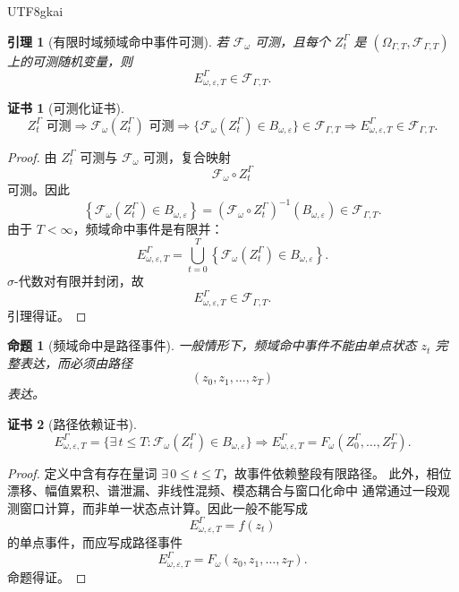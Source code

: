 \documentclass[12pt]{article}
\newtheorem{proposition}{命题}[section]
\newtheorem{lemma}{引理}[section]
\newtheorem{Certificate}{证书}[section]
\begin{document}
\begin{CJK*}{UTF8}{gkai}
\begin{lemma}[有限时域频域命中事件可测]
若 \(\mathcal F_\omega\) 可测，且每个 \(Z_t^\Gamma\) 是
\((\Omega_{\Gamma,T},\mathscr F_{\Gamma,T})\) 上的可测随机变量，则
\[
E_{\omega,\varepsilon,T}^{\Gamma}\in\mathscr F_{\Gamma,T}.
\]
\end{lemma}

\begin{Certificate}[可测化证书]
\[
\boxed{
Z_t^\Gamma\text{ 可测}
\Rightarrow
\mathcal F_\omega(Z_t^\Gamma)\text{ 可测}
\Rightarrow
\{\mathcal F_\omega(Z_t^\Gamma)\in B_{\omega,\varepsilon}\}\in\mathscr F_{\Gamma,T}
\Rightarrow
E_{\omega,\varepsilon,T}^{\Gamma}\in\mathscr F_{\Gamma,T}.
}
\]
\end{Certificate}

\begin{proof}
由 \(Z_t^\Gamma\) 可测与 \(\mathcal F_\omega\) 可测，复合映射
\[
\mathcal F_\omega\circ Z_t^\Gamma
\]
可测。因此
\[
\left\{
\mathcal F_\omega(Z_t^\Gamma)\in B_{\omega,\varepsilon}
\right\}
=
(\mathcal F_\omega\circ Z_t^\Gamma)^{-1}(B_{\omega,\varepsilon})
\in\mathscr F_{\Gamma,T}.
\]
由于 \(T<\infty\)，频域命中事件是有限并：
\[
E_{\omega,\varepsilon,T}^{\Gamma}
=
\bigcup_{t=0}^{T}
\left\{
\mathcal F_\omega(Z_t^\Gamma)\in B_{\omega,\varepsilon}
\right\}.
\]
\(\sigma\)-代数对有限并封闭，故
\[
E_{\omega,\varepsilon,T}^{\Gamma}\in\mathscr F_{\Gamma,T}.
\]
引理得证。
\end{proof}

\begin{proposition}[频域命中是路径事件]
一般情形下，频域命中事件不能由单点状态 \(z_t\) 完整表达，而必须由路径
\[
(z_0,z_1,\ldots,z_T)
\]
表达。
\end{proposition}

\begin{Certificate}[路径依赖证书]
\[
\boxed{
E_{\omega,\varepsilon,T}^{\Gamma}
=
\{\exists\,t\le T:\mathcal F_\omega(Z_t^\Gamma)\in B_{\omega,\varepsilon}\}
\Rightarrow
E_{\omega,\varepsilon,T}^{\Gamma}
=
F_\omega(Z_0^\Gamma,\ldots,Z_T^\Gamma).
}
\]
\end{Certificate}

\begin{proof}
定义中含有存在量词 \(\exists\,0\le t\le T\)，故事件依赖整段有限路径。
此外，相位漂移、幅值累积、谱泄漏、非线性混频、模态耦合与窗口化命中
通常通过一段观测窗口计算，而非单一状态点计算。因此一般不能写成
\[
E_{\omega,\varepsilon,T}^{\Gamma}=f(z_t)
\]
的单点事件，而应写成路径事件
\[
E_{\omega,\varepsilon,T}^{\Gamma}
=
F_\omega(z_0,z_1,\ldots,z_T).
\]
命题得证。
\end{proof}


\end{CJK*}
\end{document}
